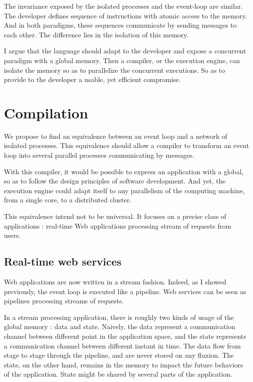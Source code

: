 The invariance exposed by the isolated processes and the event-loop are similar.
The developer defines sequence of instructions with atomic access to the memory.
And in both paradigms, these sequences communicate by sending messages to each other.
The difference lies in the isolation of this memory.

I argue that the language should adapt to the developer and expose a concurrent paradigm with a global memory.
Then a compiler, or the execution engine, can isolate the memory so as to parallelize the concurrent executions.
So as to provide to the developer a usable, yet efficient compromise.

\section{Compilation}

We propose to find an equivalence between an event loop and a network of isolated processes.
This equivalence should allow a compiler to transform an event loop into several parallel processes communicating by messages.

With this compiler, it would be possible to express an application with a global, so as to follow the design principles of software development.
And yet, the execution engine could adapt itself to any parallelism of the computing machine, from a single core, to a distributed cluster.

This equivalence intend not to be universal.
It focuses on a precise class of applications : real-time Web applications processing stream of requests from users.

\subsection{Real-time web services}

Web applications are now written in a stream fashion.
Indeed, as I showed previously, the event loop is executed like a pipeline.
Web services can be seen as pipelines processing streams of requests.

In a stream processing application, there is roughly two kinds of usage of the global memory : data and state.
Naively, the data represent a communication channel between different point in the application space, and the state represents a communication channel between different instant in time.
The data flow from stage to stage through the pipeline, and are never stored on any fluxion.
The state, on the other hand, remains in the memory to impact the future behaviors of the application.
State might be shared by several parts of the application.

